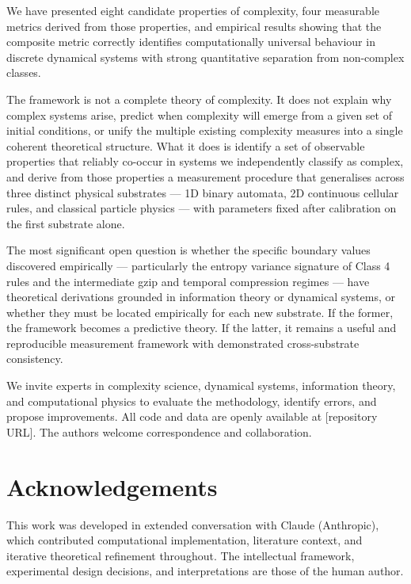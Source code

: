 \documentclass[12pt,a4paper]{article}
\begin{document}
We have presented eight candidate properties of complexity, four measurable
metrics derived from those properties, and empirical results showing that
the composite metric correctly identifies computationally universal
behaviour in discrete dynamical systems with strong quantitative
separation from non-complex classes.

The framework is not a complete theory of complexity.
It does not explain why complex systems arise, predict when complexity
will emerge from a given set of initial conditions, or unify the
multiple existing complexity measures into a single coherent theoretical
structure.
What it does is identify a set of observable properties that reliably
co-occur in systems we independently classify as complex, and derive
from those properties a measurement procedure that generalises across
three distinct physical substrates — 1D binary automata, 2D continuous
cellular rules, and classical particle physics — with parameters fixed
after calibration on the first substrate alone.

The most significant open question is whether the specific boundary
values discovered empirically — particularly the entropy variance
signature of Class 4 rules and the intermediate gzip and temporal
compression regimes — have theoretical derivations grounded in
information theory or dynamical systems, or whether they must be
located empirically for each new substrate.
If the former, the framework becomes a predictive theory.
If the latter, it remains a useful and reproducible measurement framework
with demonstrated cross-substrate consistency.

We invite experts in complexity science, dynamical systems, information
theory, and computational physics to evaluate the methodology, identify
errors, and propose improvements.
All code and data are openly available at [repository URL].
The authors welcome correspondence and collaboration.

\section*{Acknowledgements}

This work was developed in extended conversation with Claude (Anthropic),
which contributed computational implementation, literature context,
and iterative theoretical refinement throughout.
The intellectual framework, experimental design decisions, and
interpretations are those of the human author.
\end{document}
